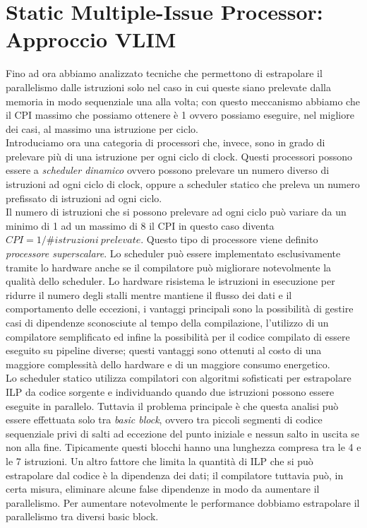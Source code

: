 \section{Static Multiple-Issue Processor: Approccio VLIM }\label{capitolo4}
Fino ad ora abbiamo analizzato tecniche che permettono di estrapolare il parallelismo dalle istruzioni solo nel caso in cui queste siano prelevate dalla memoria in modo sequenziale una alla volta; con questo meccanismo abbiamo che il CPI massimo che possiamo ottenere è 1 ovvero possiamo eseguire, nel migliore dei casi, al massimo una istruzione per ciclo.\\
Introduciamo ora una categoria di processori che, invece, sono in grado di prelevare più di una istruzione per ogni ciclo di clock. Questi processori possono essere a \emph{scheduler dinamico} ovvero possono prelevare un numero diverso di istruzioni ad ogni ciclo di clock, oppure a scheduler statico che preleva un numero prefissato di istruzioni ad ogni ciclo.\\
Il numero di istruzioni che si possono prelevare ad ogni ciclo può variare da un minimo di 1 ad un massimo di 8 il CPI in questo caso diventa $CPI= 1/ \#istruzioni \ prelevate$. Questo tipo di processore viene definito \emph{processore superscalare}. Lo scheduler può essere implementato esclusivamente tramite lo hardware anche se il compilatore può migliorare notevolmente la qualità dello scheduler. Lo hardware risistema le istruzioni in esecuzione per ridurre il numero degli stalli mentre mantiene il flusso dei dati e il comportamento delle eccezioni, i vantaggi principali sono la possibilità di gestire casi di dipendenze sconosciute al tempo della compilazione, l'utilizzo di un compilatore semplificato ed infine la possibilità per il codice compilato di essere eseguito su pipeline diverse; questi vantaggi sono ottenuti al costo di una maggiore complessità dello hardware e di un maggiore consumo energetico.\\
Lo scheduler statico utilizza compilatori con algoritmi sofisticati per estrapolare ILP da codice sorgente e individuando quando due istruzioni possono essere eseguite in parallelo. Tuttavia il problema principale è che questa analisi può essere effettuata solo tra \emph{basic block}, ovvero tra piccoli segmenti di codice sequenziale privi di salti ad eccezione del punto iniziale e nessun salto in uscita se non alla fine. Tipicamente questi blocchi hanno una lunghezza compresa tra le 4 e le 7 istruzioni. Un altro fattore che limita la quantità di ILP che si può estrapolare dal codice è la dipendenza dei dati; il compilatore tuttavia può, in certa misura, eliminare alcune false dipendenze in modo da aumentare il parallelismo. Per aumentare notevolmente le performance dobbiamo estrapolare il parallelismo tra diversi basic block.\\
